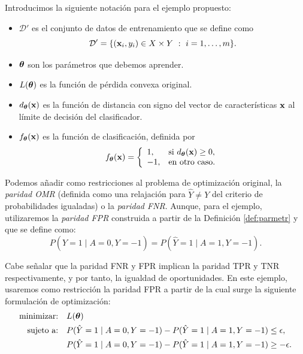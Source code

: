 \documentclass[oneside,openright,titlepage,numbers=noenddot,openany,headinclude,footinclude=true,
cleardoublepage=empty,abstractoff,BCOR=5mm,paper=a4,fontsize=12pt,main=spanish]{scrreprt}
\begin{document}
\begin{notation}
Introducimos la siguiente notación para el ejemplo propuesto:

\begin{itemize}
    \item $\mathcal{D}'$ es el conjunto de datos de entrenamiento que se define como $$\mathcal{D}'=\{(\textbf{x}_i,y_i) \in X \times Y \ : \ i=1,\dots,m\}.$$
    \item $\bm{\theta}$ son los parámetros que debemos aprender.
    \item $L(\bm{\theta})$ es la función de pérdida convexa original.
    \item $d_{\bm{\theta}}(\textbf{x})$ es la función de distancia con signo del vector de características $\textbf{x}$ al límite de decisión del clasificador.
    \item $f_{\bm{\theta}}(\textbf{x})$ es la función de clasificación, definida por $$f_{\bm{\theta}}(\textbf{x})=\left \{
    \begin{array}{l l}
    1, & \mbox{si } d_{\bm{\theta}}(\textbf{x}) \geq 0, \\
    -1, & \mbox{en otro caso}.
    \end{array}
    \right.$$
\end{itemize}
\end{notation}

Podemos añadir como restricciones al problema de optimización original, la \textit{paridad OMR} (definida como una relajación para $\hat{Y}\neq Y$ del criterio de probabilidades igualadas) o la \textit{paridad FNR}. Aunque, para el ejemplo, utilizaremos la \textit{paridad FPR} construida a partir de la Definición \ref{def:parmetr} y que se define como: $$P(\hat{Y}=1 \mid A=0, Y=-1)=P(\hat{Y}=1 \mid A=1, Y=-1).$$

\clearpage

Cabe señalar que la paridad FNR y FPR implican la paridad TPR y TNR respectivamente, y por tanto, la igualdad de oportunidades. En este ejemplo, usaremos como restricción la paridad FPR a partir de la cual surge la siguiente formulación de optimización:
\begin{equation}\label{eq:restricciones}
\begin{split}
\text{minimizar:} &\quad L(\bm{\theta})\\
\text{sujeto a:} &\quad P(\hat{Y}=1 \mid A=0, Y=-1)-P(\hat{Y}=1 \mid A=1, Y=-1) \leq \epsilon,\\
&\quad  P(\hat{Y}=1 \mid A=0, Y=-1)-P(\hat{Y}=1 \mid A=1, Y=-1) \geq -\epsilon.
\end{split}
\end{equation}
\end{document}
